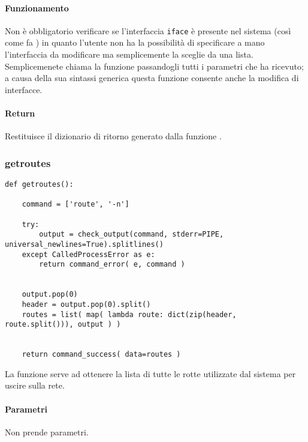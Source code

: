 \documentclass[11pt]{article}
\begin{document}
\paragraph{Funzionamento}
Non è obbligatorio verificare se l'interfaccia \texttt{iface} è presente nel sistema (così come fa
) in quanto l'utente non ha la possibilità di specificare a mano l'interfaccia
da modificare ma semplicemente la sceglie da una lista.\\
Semplicemenete chiama la funzione  passandogli tutti i parametri che ha ricevuto;
a causa della sua sintassi generica questa funzione consente anche la modifica di interfacce.
\paragraph{Return}
Restituisce il dizionario di ritorno generato dalla funzione .

\subsubsection{getroutes}\label{getroutes}
\begin{lstlisting}
def getroutes():
    
    command = ['route', '-n']

    try:
        output = check_output(command, stderr=PIPE, universal_newlines=True).splitlines()
    except CalledProcessError as e:
        return command_error( e, command )


    output.pop(0)
    header = output.pop(0).split()
    routes = list( map( lambda route: dict(zip(header, route.split())), output ) )


    return command_success( data=routes )
\end{lstlisting}
La funzione serve ad ottenere la lista di tutte le rotte utilizzate dal sistema per uscire sulla rete.
\paragraph{Parametri}
Non prende parametri.
\end{document}
